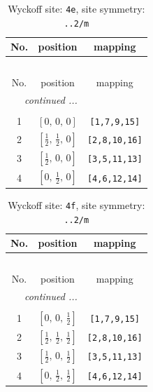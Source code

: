 \documentclass[fleqn,8pt]{jsarticle}
\begin{document}
\begin{longtable}{ccc}
\caption{Wyckoff site: {\tt 4e}, site symmetry: {\tt ..2/m}}
 \\
 \hline \hline
No. & position & mapping \\ \hline \endfirsthead

\multicolumn{2}{l}{\tablename\ \thetable{}} \\
 \hline \hline
No. & position & mapping \\ \hline \endhead

 \hline \hline
\multicolumn{2}{r}{\footnotesize\it continued ...} \\ \endfoot

 \hline \hline
\multicolumn{2}{r}{} \\ \endlastfoot

1 & $\left[ 0,\, 0,\, 0 \right]$ & {\tt [1,7,9,15]} \\ \hline
2 & $\left[ \frac{1}{2},\, \frac{1}{2},\, 0 \right]$ & {\tt [2,8,10,16]} \\ \hline
3 & $\left[ \frac{1}{2},\, 0,\, 0 \right]$ & {\tt [3,5,11,13]} \\ \hline
4 & $\left[ 0,\, \frac{1}{2},\, 0 \right]$ & {\tt [4,6,12,14]} \\
\end{longtable}
\renewcommand{\arraystretch}{1.2}
\begin{longtable}{ccc}
\caption{Wyckoff site: {\tt 4f}, site symmetry: {\tt ..2/m}}
 \\
 \hline \hline
No. & position & mapping \\ \hline \endfirsthead

\multicolumn{2}{l}{\tablename\ \thetable{}} \\
 \hline \hline
No. & position & mapping \\ \hline \endhead

 \hline \hline
\multicolumn{2}{r}{\footnotesize\it continued ...} \\ \endfoot

 \hline \hline
\multicolumn{2}{r}{} \\ \endlastfoot

1 & $\left[ 0,\, 0,\, \frac{1}{2} \right]$ & {\tt [1,7,9,15]} \\ \hline
2 & $\left[ \frac{1}{2},\, \frac{1}{2},\, \frac{1}{2} \right]$ & {\tt [2,8,10,16]} \\ \hline
3 & $\left[ \frac{1}{2},\, 0,\, \frac{1}{2} \right]$ & {\tt [3,5,11,13]} \\ \hline
4 & $\left[ 0,\, \frac{1}{2},\, \frac{1}{2} \right]$ & {\tt [4,6,12,14]} \\
\end{longtable}
\end{document}
